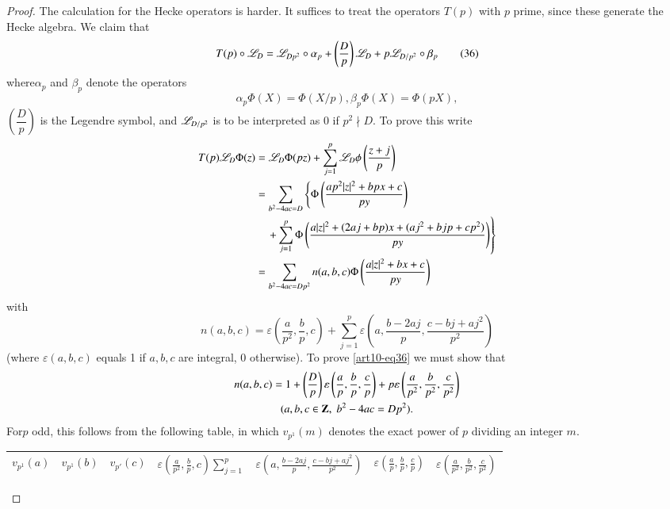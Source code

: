 \begin{proof}
The calculation for the Hecke operators is harder. It suffices to treat the operators $T(p)$ with $p$ prime, since these generate the Hecke algebra. We claim that 
\begin{equation*}
T (p) \circ \mathscr{L}_D =\mathscr{L}_{Dp^2} \circ  \alpha_p + \left(\frac{D}{p} \right) \mathscr{L}_D + p\mathscr{L}_{D/p^2} \circ \beta_p
\tag{36} \label{art10-eq36}
\end{equation*}
where\pageoriginale $\alpha_p$ and $\beta_p$ denote the operators
$$
\alpha_p \Phi (X) = \Phi (X/ p), \beta_p \Phi (X) = \Phi (pX),
$$
$\left(\dfrac{D}{p} \right)$ is the Legendre symbol, and $\mathscr{L}_{D/p^2}$ is to be interpreted as 0 if $p^2 \nmid D$.  To prove this write
\begin{align*}
T (p) \mathscr{L}_D \Phi (z) & = \mathscr{L}_D \Phi (pz) + \sum\limits^p_{j=1} \mathscr{L}_D \phi \left(\frac{z+j}{p} \right)\\
& = \sum\limits_{b^2 - 4 a c = D} \left\{\Phi \left(\frac{ap^2 |z|^2 + bpx + c}{py} \right) \right.\\
&\left.\quad  + \sum\limits^p_{j=1} \Phi \left(\frac{a|z|^2 + (2aj + bp) x + (aj^2 + b jp + cp^2)}{py} \right) \right\}\\
& = \sum\limits_{b^2 - 4 a c = D p^2} n(a, b, c) \Phi \left(\frac{a|z|^2 + b x+ c}{py} \right)
\end{align*}
with 
$$
n (a, b, c) = \varepsilon \left(\frac{a}{p^2}, \frac{b}{p}, c \right) + \sum\limits^p_{j=1} \varepsilon \left(a, \frac{b - 2 aj}{p}, \frac{c-bj+ aj^2}{p^2} \right)
$$
(where $\varepsilon (a, b, c)$ equals 1 if $a, b, c$ are integral, 0 otherwise). To prove \eqref{art10-eq36} we must show that 
\begin{gather*}
n (a, b, c) = 1+ \left(\frac{D}{p} \right) \varepsilon \left(\frac{a}{p}, \frac{b}{p}, \frac{c}{p} \right) + p \varepsilon \left(\frac{a}{p^2}, \frac{b}{p^2}, \frac{c}{p^2} \right)\\
(a, b, c \in \mathbf{Z}, \; b^2 - 4 a c = Dp^2).
\end{gather*}
For\pageoriginale $p$ odd, this follows from the following table, in which $v_{p^1} (m)$ denotes the exact power of $p$ dividing an integer $m$.
\begin{center}
{\fontsize{9}{11}\selectfont
\renewcommand{\arraystretch}{1.2}
\tabcolsep=3pt
\begin{tabular}{ccc|cccc}
$v_{p^1} (a)$ & $v_{p^1}(b)$ & $v_{p'}(c)$ & $\varepsilon \left(\frac{a}{p^2}, \frac{b}{p}, c \right) \sum\limits^p_{j=1} $  & $\varepsilon \left(a, \frac{b - 2 a j}{p} , \frac{c - bj + aj^2}{p^2}\right)$  & $\varepsilon\left(\frac{a}{p}, \frac{b}{p}, \frac{c}{p} \right) $ & $\varepsilon \left(\frac{a}{p^2}, \frac{b}{p^2}, \frac{c}{p^2} \right)$\\\hline

\end{tabular}}
\end{center}
\end{proof}
